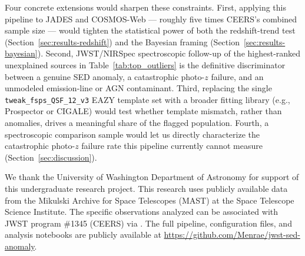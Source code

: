 \documentclass[twocolumn]{aastex631}
\begin{document}
Four concrete extensions would sharpen these constraints. First, applying
this pipeline to JADES and COSMOS-Web --- roughly five times CEERS's
combined sample size --- would tighten the statistical power of both the
redshift-trend test (Section~\ref{sec:results-redshift}) and the Bayesian
framing (Section~\ref{sec:results-bayesian}). Second, JWST/NIRSpec
spectroscopic follow-up of the highest-ranked unexplained sources in
Table~\ref{tab:top_outliers} is the definitive discriminator between a
genuine SED anomaly, a catastrophic photo-$z$ failure, and an unmodeled
emission-line or AGN contaminant. Third, replacing the single
\texttt{tweak\_fsps\_QSF\_12\_v3} EAZY template set with a broader
fitting library (e.g., Prospector or CIGALE) would test whether template
mismatch, rather than anomalies, drives a meaningful share of the
flagged population. Fourth, a spectroscopic comparison sample would let us
directly characterize the catastrophic photo-$z$ failure rate this
pipeline currently cannot measure (Section~\ref{sec:discussion}).

\begin{acknowledgments}

We thank the University of Washington Department of Astronomy for support
of this undergraduate research project. This research uses publicly
available data from the Mikulski Archive for Space Telescopes (MAST) at
the Space Telescope Science Institute. The specific observations analyzed
can be associated with JWST program \#1345 (CEERS) via
. The full pipeline,
configuration files, and analysis notebooks are publicly available at
\url{https://github.com/Menrae/jwst-sed-anomaly}.

\end{acknowledgments}




\end{document}
